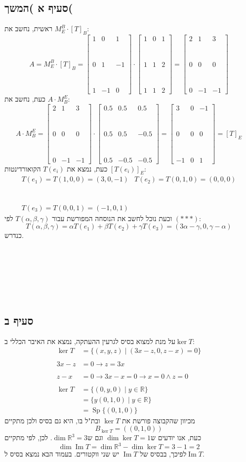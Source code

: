 \documentclass[11pt, oneside]{article}
\newcommand{\qed}{\R{$\blacksquare$}}
\newcommand{\br}{\\\\\\\\\\\\\\}
\newcommand{\opr}[1]{\xrightarrow[\text{#1}]{}}
\newcommand{\mR}{\mathbb{R}}
\newcommand{\m}[3]{\R{משפט #3#2.#1}}
\DeclareMathOperator{\Sp}{Sp}
\DeclareMathOperator{\Ima}{Im}
\begin{document}
\subsection{סעיף א )המשך(}
ראשית, נחשב את $M^{B}_{E} \cdot [T]_B$:
\[
A = M^{B}_{E} \cdot [T]_B = \begin{bmatrix}
1 & 0 & 1\br
0 & 1 & -1\br
1 & -1 & 0
\end{bmatrix} \cdot \begin{bmatrix}
1 & 0 & 1\br
1 & 1 & 2\br
1 & 1 & 2
\end{bmatrix}
= \begin{bmatrix}
2 & 1 & 3\br
0 & 0 & 0\br
0 & -1 & -1
\end{bmatrix}
\]
כעת, נחשב את $A \cdot M^{E}_{B}$:
\[
A \cdot M^{E}_{B} = \begin{bmatrix}
2 & 1 & 3\br
0 & 0 & 0\br
0 & -1 & -1
\end{bmatrix} \cdot \begin{bmatrix}
0.5 & 0.5 & 0.5\br
0.5 & 0.5 & -0.5\br
0.5 & -0.5 & -0.5
\end{bmatrix} = \begin{bmatrix}
3 & 0 & -1\br
0 & 0 & 0\br
-1 & 0 & 1
\end{bmatrix} = [T]_E
\]
כעת, נמצא את $T(e_i)$ הקואורדינטות $[T(e_i)]_E$:
\[
\begin{matrix}
T(e_1) = T(1, 0, 0) = (3, 0, -1)  & T(e_2) = T(0, 1, 0) = (0, 0, 0)\br
T(e_3) = T(0, 0, 1) = (-1, 0, 1)
\end{matrix}
\]
וכעת נוכל לחשב את הנוסחה המפורשת עבור $T(\alpha, \beta, \gamma)$ לפי $(***)$:
\[
T(\alpha, \beta, \gamma) = \alpha T(e_1) + \beta T(e_2) + \gamma T(e_3) = (3\alpha - \gamma, 0, \gamma - \alpha)
\]
כנדרש.
\br\qed
\subsection{סעיף ב}
על מנת למצוא בסיס לגרעין ההעתקה, נמצא את האיבר הכללי ב$\ker{T}$:
\begin{align*}
\ker{T} & = \{(x, y, z) \mid (3x - z, 0, z - x) = 0\}\\\\
3x - z & = 0 \opr{} z = 3x\\
z - x & = 0 \opr{} 3x - x = 0 \opr{} x = 0 \land z = 0\\
\ker{T} & = \{(0, y, 0) \mid y \in \mR\}\\
& = \{y(0, 1, 0) \mid y \in \mR\}\\
& = \Sp\{(0, 1, 0)\}
\end{align*}
מכיוון שהקבוצה פורשת את $\ker{T}$ ובת"ל בו, היא גם בסיס ולכן מתקיים
\[
B_{\ker{T}} = ((0, 1, 0))
\]
כעת, אנו יודעים ש$\dim{\ker{T}} = 1$ וגם ש$\dim{\mR^3} = 3$. לכן, לפי \m{9}{6}{1.} מתקיים
\[
\dim{\Ima{T}} = \dim{\mR^3} - \dim{\ker{T}} = 3 - 1 = 2
\]
לפיכך, בבסיס של $\Ima{T}$ יש שני ווקטורים. בעמוד הבא נמצא בסיס ל$\Ima{T}$.
\clearpage
\setcounter{subsection}{1}
\end{document}
